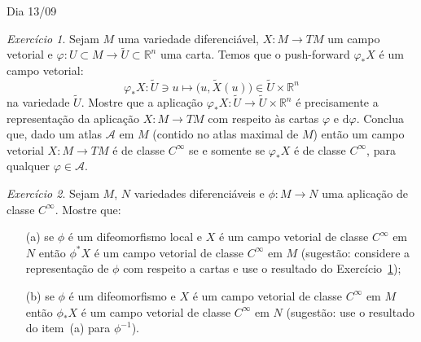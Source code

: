 \documentclass[oneside,11pt]{amsart}
\newcommand{\R}{\mathds R}
\newcommand{\dd}{\mathrm d}
\theoremstyle{remark}\newtheorem{exercise}{Exercício}[section]
\theoremstyle{plain}\newtheorem{teo}{Teorema}[section]
\theoremstyle{plain}\newtheorem{lem}[teo]{Lema}
\theoremstyle{plain}\newtheorem{prop}[teo]{Proposição}
\theoremstyle{definition}\newtheorem{defin}[teo]{Definição}
\theoremstyle{remark}\newtheorem{rem}[teo]{Observação}
\theoremstyle{definition}\newtheorem{example}[teo]{Exemplo}
\numberwithin{equation}{section}
\begin{document}
\begin{section}{Dia 13/09}
\begin{exercise}\label{exe:Xcartas}
Sejam $M$ uma variedade diferenciável, $X:M\to TM$ um campo vetorial e $\varphi:U\subset M\to\widetilde U\subset\R^n$ uma carta. Temos que
o push-forward $\varphi_*X$ é um campo vetorial:
\[\varphi_*X:\widetilde U\ni u\longmapsto\big(u,\widetilde X(u)\big)\in\widetilde U\times\R^n\]
na variedade $\widetilde U$. Mostre que a aplicação $\varphi_*X:\widetilde U\to\widetilde U\times\R^n$ é precisamente a representação da aplicação $X:M\to TM$
com respeito às cartas $\varphi$ e $\dd\varphi$. Conclua que, dado um atlas $\mathcal A$ em $M$ (contido no atlas maximal de $M$) então um campo vetorial
$X:M\to TM$ é de classe $C^\infty$ se e somente se $\varphi_*X$ é de classe $C^\infty$, para qualquer $\varphi\in\mathcal A$.
\end{exercise}

\begin{exercise}
Sejam $M$, $N$ variedades diferenciáveis e $\phi:M\to N$ uma aplicação de classe $C^\infty$. Mostre que:
\begin{itemize}
\item[(a)] se $\phi$ é um difeomorfismo local e $X$ é um campo vetorial de classe $C^\infty$ em $N$ então $\phi^*X$ é um campo vetorial de classe $C^\infty$ em $M$
(sugestão: considere a representação de $\phi$ com respeito a cartas e use o resultado do Exercício~\ref{exe:Xcartas});
\item[(b)] se $\phi$ é um difeomorfismo e $X$ é um campo vetorial de classe $C^\infty$ em $M$ então $\phi_*X$ é um campo vetorial de classe $C^\infty$ em $N$
(sugestão: use o resultado do item~(a) para $\phi^{-1}$).
\end{itemize}
\end{exercise}


\end{section}
\end{document}
